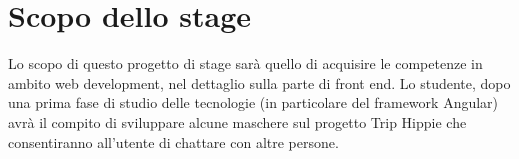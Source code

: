 \section*{Scopo dello stage}
Lo scopo di questo progetto di stage sarà quello di acquisire le competenze in ambito web development, nel dettaglio sulla parte di front end.
Lo studente, dopo una prima fase di studio delle tecnologie (in particolare del framework Angular) avrà il compito di sviluppare alcune maschere sul progetto Trip Hippie che consentiranno all'utente di chattare con altre persone.

